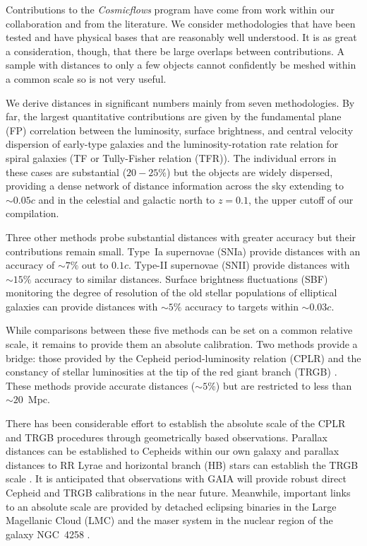 \documentclass[twocolumn]{aastex63}
\begin{document}
Contributions to the {\it Cosmicflows} program have come from work within our collaboration and from the literature.  We consider methodologies that have been tested and have physical bases that are reasonably well understood.  It is as great a consideration, though, that there be large overlaps between contributions.  A sample with distances to only a few objects cannot confidently be meshed within a common scale so is not very useful.

We derive distances in significant numbers mainly from seven methodologies.  By far, the largest quantitative contributions are given by the fundamental plane (FP) correlation between the luminosity, surface brightness, and central velocity dispersion of early-type galaxies \citep{1987ApJ...313...42D, 1987ApJ...313...59D} and the luminosity-rotation rate relation for spiral galaxies \citep{1977A&A....54..661T} (TF or Tully-Fisher relation (TFR)).  The individual errors in these cases are substantial ($20-25\%$) but the objects are widely dispersed, providing a dense network of distance information across the sky extending to $\sim0.05c$ and in the celestial and galactic north to $z=0.1$, the upper cutoff of our compilation.

Three other methods probe substantial distances with greater accuracy but their contributions remain small.  Type~Ia supernovae (SNIa) \citep{1993ApJ...413L.105P} provide distances with an accuracy of $\sim7\%$ out to $0.1c$.  Type-II supernovae (SNII) \citep{2002ApJ...566L..63H} provide distances with $\sim15\%$ accuracy to similar distances.  Surface brightness fluctuations (SBF) monitoring the degree of resolution of the old stellar populations of elliptical galaxies \citep{1988AJ.....96..807T} can provide distances with $\sim5\%$ accuracy to targets within $\sim0.03c$.

While comparisons between these five methods can be set on a common relative scale, it remains to provide them an absolute calibration.  Two methods provide a bridge: those provided by the Cepheid period-luminosity relation (CPLR) \citep{1912HarCi.173....1L} and the constancy of stellar luminosities at the tip of the red giant branch (TRGB) \citep{1993ApJ...417..553L}.  These methods provide accurate distances ($\sim5\%$) but are restricted to less than $\sim 20$~Mpc. 

There has been considerable effort to establish the absolute scale of the CPLR and TRGB procedures through geometrically based observations.  Parallax distances can be established to Cepheids within our own galaxy \citep{2007AJ....133.1810B} and parallax distances to RR Lyrae and horizontal branch (HB) stars can establish the TRGB scale \citep{2007ApJ...661..815R}.  It is anticipated that observations with GAIA \citep{2018ASPC..514...89C, 2019PASA...36....1M} will provide robust direct Cepheid and TRGB calibrations in the near future.  Meanwhile, important links to an absolute scale are provided by detached eclipsing binaries in the Large Magellanic Cloud (LMC) \citep{2019Natur.567..200P} and the maser system in the nuclear region of the galaxy NGC~4258 \citep{2019ApJ...886L..27R}.
\end{document}
